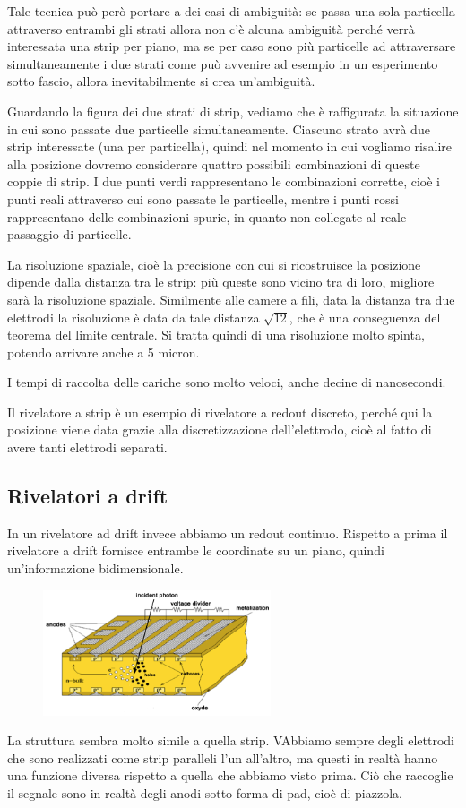 Tale tecnica può però portare a dei casi di ambiguità: se passa una sola particella attraverso entrambi gli strati allora non c'è alcuna ambiguità perché verrà interessata una strip per piano, ma se per caso sono più particelle ad attraversare simultaneamente i due strati come può avvenire ad esempio in un esperimento sotto fascio, allora inevitabilmente si crea un'ambiguità.

Guardando la figura dei due strati di strip, vediamo che è raffigurata la situazione in cui sono passate due particelle simultaneamente. Ciascuno strato avrà due strip interessate (una per particella), quindi nel momento in cui vogliamo risalire alla posizione dovremo considerare quattro possibili combinazioni di queste coppie di strip. I due punti verdi rappresentano le combinazioni corrette, cioè i punti reali attraverso cui sono passate le particelle, mentre i punti rossi rappresentano delle combinazioni spurie, in quanto non collegate al reale passaggio di particelle. 

La risoluzione spaziale, cioè la precisione con cui si ricostruisce la posizione dipende dalla distanza tra le strip: più queste sono vicino tra di loro, migliore sarà la risoluzione spaziale. Similmente alle camere a fili, data la distanza tra due elettrodi la risoluzione è data da tale distanza $\sqrt{12}$, che è una conseguenza del teorema del limite centrale. Si tratta quindi di una risoluzione molto spinta, potendo arrivare anche a 5 micron.

I tempi di raccolta delle cariche sono molto veloci, anche decine di nanosecondi.

Il rivelatore a strip è un esempio di rivelatore a redout discreto, perché qui la posizione viene data grazie alla discretizzazione dell'elettrodo, cioè al fatto di avere tanti elettrodi separati.

\subsection{Rivelatori a drift}

In un rivelatore ad drift invece abbiamo un redout continuo. Rispetto a prima il rivelatore a drift fornisce entrambe le coordinate su un piano, quindi un'informazione bidimensionale.
\begin{figure}[H]
   \centering
   \includegraphics[width=0.6\textwidth]{immagini/rivelatori_a_drift.png}
\end{figure}
La struttura sembra molto simile a quella strip. VAbbiamo sempre degli elettrodi che sono realizzati come strip paralleli l'un all'altro, ma questi in realtà hanno una funzione diversa rispetto a quella che abbiamo visto prima. Ciò che raccoglie il segnale sono in realtà degli anodi sotto forma di pad, cioè di piazzola.

